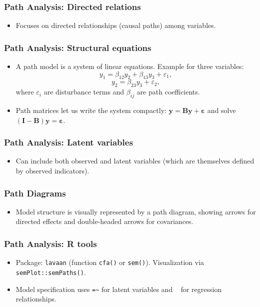 \documentclass{beamer}
\newcommand{\code}[1]{\texttt{#1}}
\begin{document}
\begin{frame}
    \frametitle{Path Analysis: Directed relations}
    \begin{itemize}
        \item Focuses on directed relationships (causal paths) among variables.
    \end{itemize}
\end{frame}

\begin{frame}
    \frametitle{Path Analysis: Structural equations}
    \begin{itemize}
        \item A path model is a system of linear equations. Example for three variables:
        \[y_1=\beta_{12}y_2+\beta_{13}y_3+\varepsilon_1,\]
        \[y_2=\beta_{23}y_3+\varepsilon_2,\]
        where $\varepsilon_i$ are disturbance terms and $\beta_{ij}$ are path coefficients.
        \item Path matrices let us write the system compactly: $\mathbf{y}=\mathbf{B}\mathbf{y}+\boldsymbol{\varepsilon}$ and solve $(\mathbf{I}-\mathbf{B})\mathbf{y}=\boldsymbol{\varepsilon}$.
    \end{itemize}
\end{frame}

\begin{frame}
    \frametitle{Path Analysis: Latent variables}
    \begin{itemize}
        \item Can include both observed and \alert{latent variables} (which are themselves defined by observed indicators).
    \end{itemize}
\end{frame}

\begin{frame}
    \frametitle{Path Diagrams}
    \begin{itemize}
        \item Model structure is visually represented by a \alert{path diagram}, showing arrows for directed effects and double-headed arrows for covariances.
    \end{itemize}
\end{frame}

\begin{frame}
    \frametitle{Path Analysis: R tools}
    \begin{itemize}
        \item Package: \code{lavaan} (function \code{cfa()} or \code{sem()}). Visualization via \code{semPlot::semPaths()}.
        \item Model specification uses \texttt{=\~} for latent variables and \texttt{~} for regression relationships.
    \end{itemize}
\end{frame}
\end{document}
